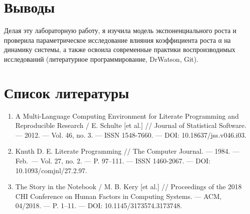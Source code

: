 \documentclass[
  12pt,
  a4paper,
  DIV=11,
  numbers=noendperiod]{scrreprt}
\begin{document}
\chapter{Выводы}\label{ux432ux44bux432ux43eux434ux44b}

Делая эту лабораторную работу, я изучила модель экспоненциального роста
и проверила параметрическое исследование влияния коэффициента роста α на
динамику системы, а также освоила современные практики воспроизводимых
исследований (литературное программирование, DrWatson, Git).

\chapter*{Список
литературы}\label{ux441ux43fux438ux441ux43eux43a-ux43bux438ux442ux435ux440ux430ux442ux443ux440ux44b}

\begin{enumerate}
\def\labelenumi{\arabic{enumi}.}
\item
  A Multi-Language Computing Environment for Literate Programming and
  Reproducible Research / E. Schulte {[}et al.{]} // Journal of
  Statistical Software. --- 2012. --- Vol. 46, no. 3. --- ISSN
  1548-7660. --- DOI: 10.18637/jss.v046.i03.
\item
  Knuth D. E. Literate Programming // The Computer Journal. --- 1984.
  --- Feb.~--- Vol. 27, no. 2. --- P. 97--111. --- ISSN 1460-2067. ---
  DOI: 10.1093/comjnl/27.2.97.
\item
  The Story in the Notebook / M. B. Kery {[}et al.{]} // Proceedings of
  the 2018 CHI Conference on Human Factors in Computing Systems. ---
  ACM, 04/2018. --- P. 1--11. --- DOI: 10.1145/3173574.3173748.
\end{enumerate}


\printbibliography
\end{document}
